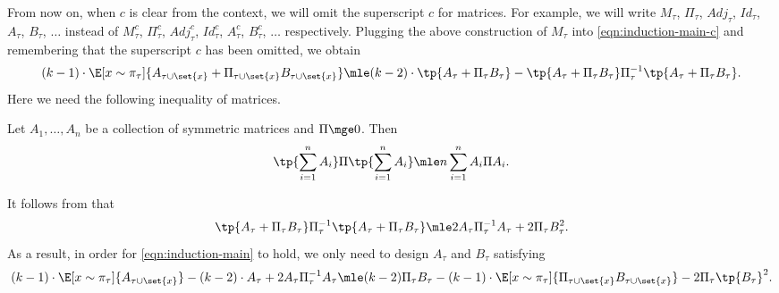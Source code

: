 From now on, when $c$ is clear from the context, we will omit the superscript $c$ for matrices.
For example, we will write $M_\tau$, $\Pi_\tau$, $\!{Adj}_\tau$, $\!{Id}_\tau$, $A_\tau$, $B_\tau$, $\dots$ instead of
                           $M^c_\tau$, $\Pi^c_\tau$, $\!{Adj}_\tau^{c}$, $\!{Id}_\tau^{c}$, $A_\tau^c$, $B_\tau^c$, $\dots$ respectively.
Plugging the above construction of $M_\tau$ into \eqref{eqn:induction-main-c} and remembering that the superscript $c$ has been omitted, we obtain
 \[
 (k-1)\cdot\E[x\sim\pi_\tau]{A_{\tau\cup\set{x}}+\Pi_{\tau\cup\set{x}}B_{\tau\cup\set{x}}} \mle (k-2)\cdot\tp{A_\tau+\Pi_\tau B_\tau} -\tp{A_\tau+\Pi_\tau B_\tau}\Pi_\tau^{-1}\tp{A_\tau+\Pi_\tau B_\tau}.
 \]
Here we need the following inequality of matrices.
\begin{lemma}
	\label{lem:matrix-squared-sum}
Let $A_1,\dots,A_n$ be a collection of symmetric matrices and $\Pi\mge 0$. Then
\[
	\tp{\sum_{i=1}^n A_i}\Pi \tp{\sum_{i=1}^n A_i} \mle n\sum_{i=1}^n A_i\Pi A_i.
\]	
\end{lemma}
 It follows from  that
 \[
 \tp{A_\tau+\Pi_\tau B_\tau}\Pi_\tau^{-1}\tp{A_\tau+\Pi_\tau B_\tau}\mle 2A_\tau\Pi_\tau^{-1}A_\tau + 2\Pi_\tau B_\tau^2.
 \]
 As a result, in order for \eqref{eqn:induction-main} to hold, we only need to design $A_\tau$ and $B_\tau$  satisfying
\begin{equation}\label{eqn:condition-main}
 	(k-1)\cdot \E[x\sim\pi_\tau]{A_{\tau\cup\set{x}}} - (k-2) \cdot A_\tau+2A_\tau \Pi_\tau^{-1} A_\tau  \mle (k-2)\Pi_\tau B_\tau -(k-1)\cdot \E[x\sim\pi_\tau]{\Pi_{\tau\cup\set{x}} B_{\tau\cup\set{x}}}-2\Pi_\tau\tp{B_\tau}^2.
\end{equation}

